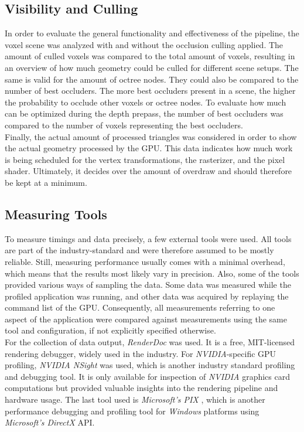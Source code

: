 \subsection*{Visibility and Culling} \label{subsec-visibility-and-culling}

In order to evaluate the general functionality and effectiveness of the pipeline, the voxel scene was analyzed 
with and without the occlusion culling applied. The amount of culled voxels was compared to the total amount of 
voxels, resulting in an overview of how much geometry could be culled for different scene setups. The same is 
valid for the amount of octree nodes. They could also be compared to the number of best occluders. The more best 
occluders present in a scene, the higher the probability to occlude other voxels or octree nodes. To evaluate 
how much can be optimized during the depth prepass, the number of best occluders was compared to the number 
of voxels representing the best occluders. \\

\noindent
Finally, the actual amount of processed triangles was considered in order to show the actual geometry processed 
by the \ac{GPU}. This data indicates how much work is being scheduled for the vertex transformations, the rasterizer, 
and the pixel shader. Ultimately, it decides over the amount of overdraw and should therefore be kept at a minimum.


\subsection*{Measuring Tools} \label{subsec-measuring-tools}

To measure timings and data precisely, a few external tools were used. All tools are part of the 
industry-standard and were therefore assumed to be mostly reliable. Still, measuring performance usually 
comes with a minimal overhead, which means that the results most likely vary in precision. Also, some of 
the tools provided various ways of sampling the data. Some data was measured while the profiled application 
was running, and other data was acquired by replaying the command list of the \ac{GPU}. Consequently, all 
measurements referring to one aspect of the application were compared against measurements using the same 
tool and configuration, if not explicitly specified otherwise. \\

\noindent
For the collection of data output, \emph{RenderDoc} \cite{RenderDoc} was used. It is a free, MIT-licensed 
rendering debugger, widely used in the industry. For \emph{NVIDIA}-specific \ac{GPU} profiling, \emph{NVIDIA NSight} 
\cite{NSight} was used, which is another industry standard profiling and debugging tool. It is only available for 
inspection of \emph{NVIDIA} graphics card computations but provided valuable insights into the rendering pipeline 
and hardware usage. The last tool used is \emph{Microsoft's PIX} \cite{PIX}, which is another performance debugging 
and profiling tool for \emph{Windows} platforms using \emph{Microsoft's DirectX} \ac{API}. \\

